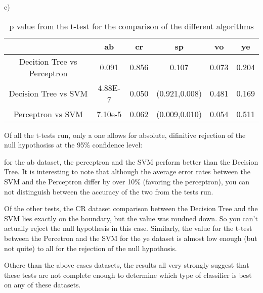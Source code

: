 \documentclass[12pt]{article}
\begin{document}
c) 
\begin{table}[ht!]
    \begin{tabular}{|c|c|c|c|c|c|} \hline
                                & ab      & cr    & sp     & vo      & ye\\ \hline
    Decition Tree vs Perceptron & 0.091   & 0.856 & 0.107  & 0.073   &0.204\\ \hline
    Decision Tree vs SVM        & 4.88E-7 & 0.050 & (0.921,0.008)   & 0.481   &0.169\\ \hline
    Perceptron vs SVM           & 7.10e-5 & 0.062 & (0.009,0.010)   & 0.054   &0.511\\ \hline  
    \hline
    \end{tabular}
    \caption{p value from the t-test for the comparison of the different algorithms }
\end{table}

Of all the t-tests run, only a one allows for absolute, difinitive rejection of the null 
hypothosiss at the 95\% confidence level: 

for the ab dataset, the perceptron and the SVM perform better than the Decision Tree. 
It is interesting to note that although the average error rates between the SVM and the Perceptron
differ by over 10\% (favoring the perceptron), you can not distinguish between the accuracy of the two 
from the tests run. 

Of the other tests, the CR dataset comparison between the Decision Tree and the SVM lies exactly 
on the boundary, but the value was roudned down. So you can't actually reject the null hypothesis
in this case. Similarly, the value for the t-test between the Percetron and the SVM for the ye 
dataset is almost low enough (but not quite) to all for the rejection of the null hypothosis. 

Othere than the above cases datasets, the results all very strongly suggest that these tests are not 
complete enough to determine which type of classifier is best on any of these datasets. 
    
\end{document}

